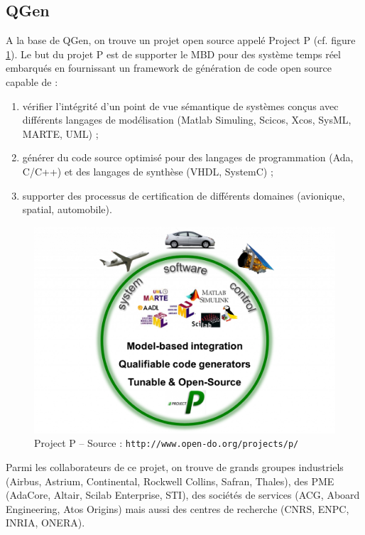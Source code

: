 \subsection{QGen}
A la base de QGen, on trouve un projet open source appelé
Project P (cf. figure \ref{fig:projectp}). Le but du projet P est de supporter le MBD pour des
système temps réel embarqués en fournissant un framework de génération de code
open source capable de :
\begin{enumerate}
  \item vérifier l'intégrité d'un point de vue sémantique de systèmes conçus avec
	différents langages de modélisation (Matlab\up{\circledR}
	Simuling\up{\circledR}, Scicos, Xcos, SysML, MARTE, UML) ;
  \item générer du code source optimisé pour des langages de programmation
	(Ada, C/C++) et des langages de synthèse (VHDL, SystemC) ;
  \item supporter des processus de certification de différents domaines
	(avionique, spatial, automobile).
\end{enumerate}

\begin{figure}[h]
  \centering
  \includegraphics[scale=0.3]{images/projectp}
  \caption{Project P -- Source : {\tt http://www.open-do.org/projects/p/}}
  \label{fig:projectp}
\end{figure}

Parmi les collaborateurs de ce projet, on trouve de grands groupes industriels
(Airbus, Astrium, Continental, Rockwell Collins, Safran, Thales), des PME
(AdaCore, Altair, Scilab Enterprise, STI), des sociétés de services (ACG, Aboard
Engineering, Atos Origins) mais aussi des centres de recherche (CNRS, ENPC,
INRIA, ONERA).\\

